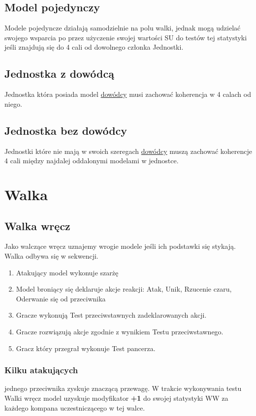 \subsection{Model pojedynczy}
Modele pojedyncze działają samodzielnie na polu walki, jednak mogą udzielać swojego wsparcia po przez użyczenie swojej wartości SU do testów tej statystyki jeśli znajdują się do 4 cali od dowolnego członka Jednostki.

\subsection{Jednostka z dowódcą}
Jednostka która posiada model \hyperref[sec:link_uw_dowdoca]{dowódcy} musi zachować koherencja w 4 calach od niego.  

\subsection{Jednostka bez dowódcy}
Jednostki które nie mają w swoich szeregach \hyperref[sec:link_uw_dowdoca]{dowódcy} muszą zachować koherencje 4 cali między najdalej oddalonymi modelami w jednostce. 

\section{Walka}
\subsection{Walka wręcz}
Jako walczące wręcz uznajemy wrogie modele jeśli ich podstawki się stykają. Walka odbywa się w sekwencji.
\begin{enumerate}
    \item Atakujący model wykonuje szarżę
    \item Model broniący się deklaruje akcje reakcji: Atak, Unik, Rzucenie czaru, Oderwanie się od przeciwnika
    \item Gracze wykonują Test przeciwstawnych zadeklarowanych akcji.
    \item Gracze rozwiązują akcje zgodnie z wynikiem Testu przeciwstawnego.
    \item Gracz który przegrał wykonuje Test pancerza.
\end{enumerate}

\subsubsection{Kilku atakujących} jednego przeciwnika zyskuje znaczącą przewagę. W trakcie wykonywania testu Walki wręcz model uzyskuje modyfikator \textbf{+1} do swojej statystyki WW za każdego kompana uczestniczącego w tej walce. 

